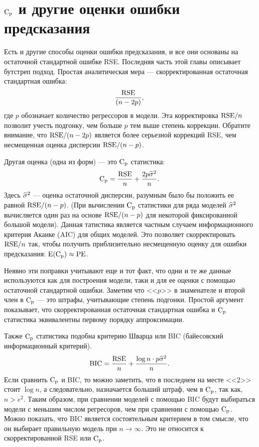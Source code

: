 
\section{$\text{C}_{\text{p}}$ и другие оценки ошибки предсказания}
Есть и другие способы оценки ошибки предсказания, и все они основаны на остаточной стандартной ошибке RSE. Последняя часть этой главы описывает бутстреп подход. Простая аналитическая мера --- скорректированная остаточная стандартная ошибка:
\begin{equation}
\frac{\text{RSE}}{(n - 2p)},
\end{equation}
где $p$ обозначает количество регрессоров в модели. 
Эта корректировка $\text{RSE} / n$ позволит учесть подгонку, чем больше $p$ тем выше степень коррекции. Обратите внимание, что $\text{RSE} / (n-2p)$ является более серьезной коррекций RSE, чем несмещенная оценка дисперсии $\text{RSE} / (n-p)$.

Другая оценка (одна из форм) --- это $\text{C}_{\text{p}}$ статистика:
\begin{equation}
\text{C}_{\text{p}} = \frac{\text{RSE}}{n} + \frac{2p\widehat{\sigma}^{2}}{n}.
\end{equation}
Здесь $\widehat{\sigma}^{2}$ --- оценка остаточной дисперсии, разумным было бы положить ее равной $\text{RSE} / (n - p)$. (При вычислении $\text{C}_{\text{p}}$ статистики для ряда моделей $\widehat{\sigma}^{2}$ вычисляется один раз на основе $\text{RSE} / (n - p)$ для некоторой фиксированной большой модели). 
Данная татистика является частным случаем информационного критерия Акаике (AIC) для общих моделей. Это позволяет скорректировать $\text{RSE} / n$ так, чтобы получить приблизительно несмещенную оценку для ошибки предсказания: $\text{E}(\text{C}_{\text{p}}) \approx \text{PE}$.

Неявно эти поправки учитывают еще и тот факт, что одни и те же данные используются как для построения модели, таки и для ее оценки с помощью остаточной стандартной ошибки. Заметим что <<$p$>> в знаменателе и второй член в $\text{C}_{\text{p}}$ --- это штрафы, учитывающие степень подгонки. Простой аргумент показывает, что скорректированная остаточная стандартная ошибка и $\text{C}_{\text{p}}$ статистика эквивалентны первому порядку аппроксимации.

Также $\text{C}_{\text{p}}$ статистика подобна критерию Шварца или BIC (байесовский информационный критерий).
\begin{equation}
\text{BIC} = \frac{\text{RSE}}{n} +\frac{ \log n \cdot p \widehat{\sigma}^{2}}{n}.
\end{equation}
Если сравнить $\text{C}_{\text{p}}$ и BIC, то можно заметить, что в последнем на месте <<2>> стоит $\log n$, а следовательно, назначается больший штраф, чем в $\text{C}_{\text{p}}$, так как, $n > e^{2}$. Таким образом, при сравнении моделей с помощью BIC будут выбираться модели с меньшим числом регресоров, чем при сравнении с помощью $\text{C}_{\text{p}}$. Можно показать, что BIC является состоятельным критерием в том смысле, что он выбирает правильную модель при $n \rightarrow \infty $. Это не относится к скорректированной RSE или $\text{C}_{\text{p}}$.

